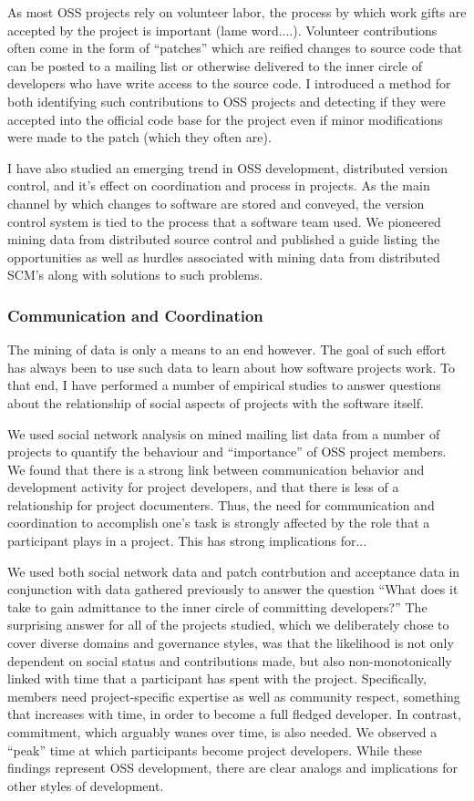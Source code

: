 \documentclass[10pt]{article}
\newcommand\Subsection[1]{\subsubsection*{#1}}
\begin{document}
\begin{small}
As most OSS projects rely on volunteer labor, the process by which work gifts
are accepted by the project is important (lame word....).  Volunteer
contributions often come in the form of ``patches'' which are reified changes
to source code that can be posted to a mailing list or otherwise delivered to
the inner circle of developers who have write access to the source code.  I
introduced a method for both identifying such contributions to OSS projects and
detecting if they were accepted into the official code base for the project
even if minor modifications were made to the patch (which they often are).  

I have also studied an emerging trend in OSS development, distributed version
control, and it's effect on coordination and process in projects.  As the main
channel by which changes to software are stored and conveyed, the version
control system is tied to the process that a software team used.  We pioneered
mining data from distributed source control and published a guide listing the
opportunities as well as hurdles associated with mining data from distributed
SCM's along with solutions to such problems.


\Subsection{Communication and Coordination}

The mining of data is only a means to an end however.  The goal of such
effort has always been to use such data to learn about how software
projects work.  To that end, I have performed a number of empirical studies
to answer questions about the relationship of social aspects of projects
with the software itself.

We used social network analysis on mined mailing list data from a number of projects 
to quantify the behaviour and ``importance'' of OSS project members.
We found that there is a strong link between communication behavior and
development activity for project developers, and that there is less of a
relationship for project documenters.  Thus, the need for communication and
coordination to accomplish one's task is strongly affected by the role that a
participant plays in a project.  This has strong implications for...

We used both social network data and patch contrbution and acceptance data in
conjunction with data gathered previously to answer the question ``What does it
take to gain admittance to the inner circle of committing developers?'' The
surprising answer for all of the projects studied, which we deliberately chose
to cover diverse domains and governance styles, was that the likelihood is not
only dependent on social status and contributions made, but also
non-monotonically linked with time that a participant has spent with the
project.  Specifically, members need project-specific expertise as well as
community respect, something that increases with time, in order to become a
full fledged developer.  In contrast, commitment, which arguably wanes over
time, is also needed.  We observed a ``peak'' time at which participants become
project developers.  While these findings represent OSS development, there are
clear analogs and implications for other styles of development.


\end{small}
\end{document}
